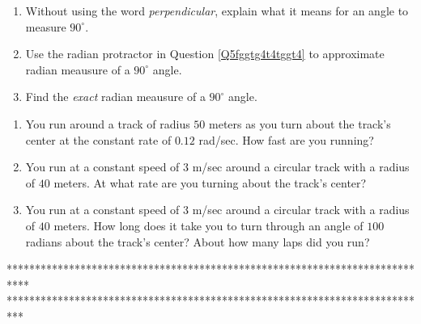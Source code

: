 \documentclass{ximera}
\begin{document}
\begin{question} \label{Q435g5yyhhhht}
\begin{enumerate}
\item Without using the word \emph{perpendicular}, explain what it means for an angle to measure $90^\circ$.

\item Use the radian protractor in Question \ref{Q5fggtg4t4tggt4} to approximate radian meausure of a $90^\circ$ angle.

\item Find the \emph{exact} radian meausure of a $90^\circ$ angle.
\end{enumerate}
\end{question}

\begin{question}  \label{Q5y345ttg354t}
\begin{enumerate}

\item You run around a track of radius $50$ meters as you turn about the track's center at the constant rate of $0.12$ rad/sec. How fast are you running?

\item You run at a constant speed of $3$ m/sec around a circular track with a radius of $40$ meters. At what rate are you turning about the track's center?

\item You run at a constant speed of $3$ m/sec around a circular track with a radius of $40$ meters. How long does it take you to turn through an angle of $100$ radians about the track's center? About how many laps did you run?

\end{enumerate}
\end{question}
















\iffalse
****************************************************************************
***************************************************************************
\end{document}
